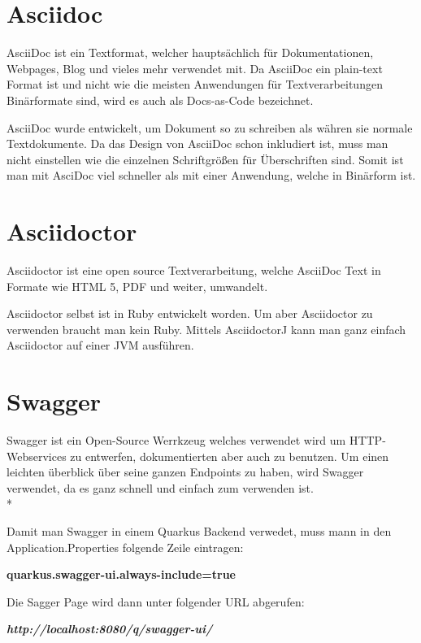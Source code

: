 \section{Asciidoc}
\author{David Ignjatovic}

AsciiDoc ist ein Textformat, welcher hauptsächlich für Dokumentationen, Webpages, Blog und vieles mehr verwendet mit.
Da AsciiDoc ein plain-text Format ist und nicht wie die meisten Anwendungen für Textverarbeitungen Binärformate sind, wird es auch als Docs-as-Code bezeichnet.

AsciiDoc wurde entwickelt, um Dokument so zu schreiben als währen sie normale Textdokumente. Da das Design von AsciiDoc schon inkludiert ist,
muss man nicht einstellen wie die einzelnen Schriftgrößen für Überschriften sind. Somit ist man mit AsciDoc viel schneller als mit einer Anwendung,
welche in Binärform ist.

\section{Asciidoctor}
\author{David Ignjatovic}

Asciidoctor ist eine open source Textverarbeitung, welche AsciiDoc Text in Formate wie HTML 5, PDF und weiter, umwandelt.

Asciidoctor selbst ist in Ruby entwickelt worden. Um aber Asciidoctor zu verwenden braucht man kein Ruby. Mittels AsciidoctorJ
kann man ganz einfach Asciidoctor auf einer JVM ausführen.

\pagebreak

\section{Swagger}
\author{David Ignjatovic} 

Swagger ist ein Open-Source Werrkzeug welches verwendet wird um HTTP-Webservices zu entwerfen, dokumentierten aber auch zu benutzen. Um einen leichten überblick über seine 
ganzen Endpoints zu haben, wird Swagger verwendet, da es ganz schnell und einfach zum verwenden ist. \\*

Damit man Swagger in einem Quarkus Backend verwedet, muss mann in den Application.Properties folgende Zeile eintragen:

\textbf{quarkus.swagger-ui.always-include=true}

Die Sagger Page wird dann unter folgender URL abgerufen: 

\textbf{\textit{http://localhost:8080/q/swagger-ui/ }}

